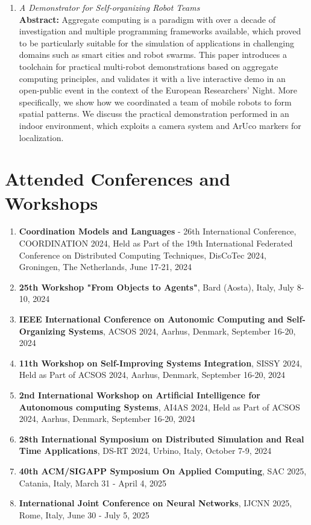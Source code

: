 \documentclass[runningheads]{llncs}
\begin{document}
\begin{enumerate}
    \item \emph{A Demonstrator for Self-organizing Robot Teams}~\cite{DBLP:conf/coordination/AguzziBBCCDFPV25} \\
    \textbf{Abstract: }
    Aggregate computing is a paradigm with over a decade of investigation and multiple programming frameworks available, 
     which proved to be particularly suitable for the simulation of applications in challenging domains such as smart cities
     and robot swarms. 
    This paper introduces a toolchain for practical multi-robot demonstrations based on aggregate computing principles, 
     and validates it with a live interactive demo in an open-public event in the context of the European Researchers' Night. 
    More specifically, we show how we coordinated a team of mobile robots to form spatial patterns.
    We discuss the practical demonstration performed in an indoor environment, 
     which exploits a camera system and ArUco markers for localization.
\end{enumerate}


\section{Attended Conferences and Workshops}
\begin{enumerate}
    \item \textbf{Coordination Models and Languages} - 26th International Conference, COORDINATION 2024, Held as Part of the 19th International Federated Conference on Distributed Computing Techniques, DisCoTec 2024, Groningen, The Netherlands, June 17-21, 2024
    \item \textbf{25th Workshop "From Objects to Agents"}, Bard (Aosta), Italy, July 8-10, 2024
    \item \textbf{IEEE International Conference on Autonomic Computing and Self-Organizing Systems}, ACSOS 2024, Aarhus, Denmark, September 16-20, 2024
    \item \textbf{11th Workshop on Self-Improving Systems Integration}, SISSY 2024, Held as Part of ACSOS 2024, Aarhus, Denmark, September 16-20, 2024
    \item \textbf{2nd International Workshop on Artificial Intelligence for Autonomous computing Systems}, AI4AS 2024, Held as Part of ACSOS 2024, Aarhus, Denmark, September 16-20, 2024
    \item \textbf{28th International Symposium on Distributed Simulation and Real Time Applications}, DS-RT 2024, Urbino, Italy, October 7-9, 2024
    \item \textbf{40th ACM/SIGAPP Symposium On Applied Computing}, SAC 2025, Catania, Italy, March 31 - April 4, 2025
    \item \textbf{International Joint Conference on Neural Networks}, IJCNN 2025, Rome, Italy,  June 30 - July 5, 2025
\end{enumerate}
\end{document}
